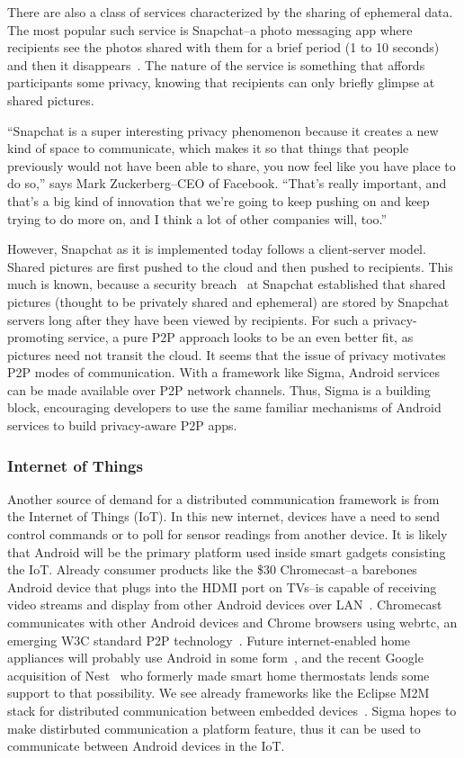 \documentclass[prodmode]{acmlarge}
\begin{document}
There are also a class of services characterized by the sharing of ephemeral data. The most popular such service is Snapchat--a photo messaging app where recipients see the photos shared with them for a brief period (1 to 10 seconds) and then it disappears~\cite{Snapchat}. The nature of the service is something that affords participants some privacy, knowing that recipients can only briefly glimpse at shared pictures.

``Snapchat is a super interesting privacy phenomenon because it creates a new kind of space to communicate, which makes it so that things that people previously would not have been able to share, you now feel like you have place to do so,'' says Mark Zuckerberg--CEO of Facebook. ``That's really important, and that's a big kind of innovation that we're going to keep pushing on and keep trying to do more on, and I think a lot of other companies will, too.''~\cite{Zuckerberg}

However, Snapchat as it is implemented today follows a client-server model. Shared pictures are first pushed to the cloud and then pushed to recipients. This much is known, because a security breach~\cite{SnapchatHack} at Snapchat established that shared pictures (thought to be privately shared and ephemeral) are stored by Snapchat servers long after they have been viewed by recipients. For such a privacy-promoting service, a pure P2P approach looks to be an even better fit, as pictures need not transit the cloud. It seems that the issue of privacy motivates P2P modes of communication. With a framework like Sigma, Android services can be made available over P2P network channels. Thus, Sigma is a building block, encouraging developers to use the same familiar mechanisms of Android services to build privacy-aware P2P apps.

\subsubsection{Internet of Things}
Another source of demand for a distributed communication framework is from the Internet of Things (IoT). In this new internet, devices have a need to send control commands or to poll for sensor readings from another device. It is likely that Android will be the primary platform used inside smart gadgets consisting the IoT. Already consumer products like the \$30 Chromecast--a barebones Android device that plugs into the HDMI port on TVs--is capable of receiving video streams and display from other Android devices over LAN~\cite{chromecast}. Chromecast communicates with other Android devices and Chrome browsers using webrtc, an emerging W3C standard P2P technology~\cite{ChromecastWebrtc}. Future internet-enabled home appliances will probably use Android in some form~\cite{AndroidEverywhere}, and the recent Google acquisition of Nest~\cite{GoogleNest} who formerly made smart home thermostats lends some support to that possibility. We see already frameworks like the Eclipse M2M stack for distributed communication between embedded devices~\cite{eclipse_m2m}. Sigma hopes to make distirbuted communication a platform feature, thus it can be used to communicate between Android devices in the IoT.
\end{document}
